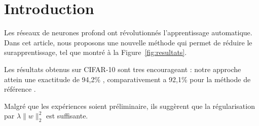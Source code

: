 \documentclass{article}
\begin{document}
\section{Introduction}

Les réseaux de neurones profond ont révolutionnés l'apprentissage automatique.
Dans cet article, nous proposons une nouvelle méthode qui permet de réduire
le surapprentissage, tel que montré à la Figure~\ref{fig:resultats}.

Les résultats obtenus sur CIFAR-10 sont tres encourageant : notre approche
attein une exactitude de 94,2\% , comparativement a 92,1\% pour la méthode
de référence \cite{he2016deep}.

Malgré que les expériences soient préliminaire, ils suggèrent que
la régularisation par $\lambda \|w\|_2^2$ est suffisante.
\end{document}
